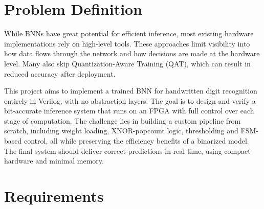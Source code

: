 \documentclass[a4paper,12pt]{report}
\begin{document}
\section{Problem Definition}
While BNNs have great potential for efficient inference, most existing hardware implementations rely on high-level tools. These approaches limit visibility into how data flows through the network and how decisions are made at the hardware level. Many also skip Quantization-Aware Training (QAT), which can result in reduced accuracy after deployment.

This project aims to implement a trained BNN for handwritten digit recognition entirely in Verilog, with no abstraction layers. The goal is to design and verify a bit-accurate inference system that runs on an FPGA with full control over each stage of computation. The challenge lies in building a custom pipeline from scratch, including weight loading, XNOR-popcount logic, thresholding and FSM-based control, all while preserving the efficiency benefits of a binarized model. The final system should deliver correct predictions in real time, using compact hardware and minimal memory.

\section{Requirements}
\end{document}
